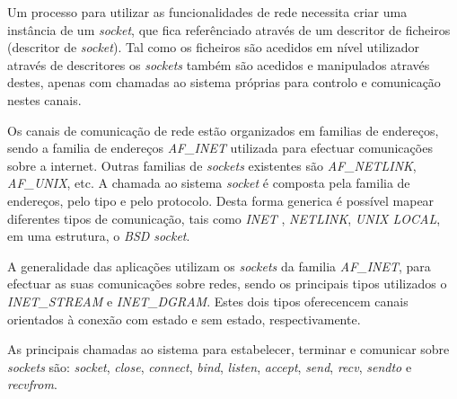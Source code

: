  Um processo para utilizar as funcionalidades de rede necessita criar uma instância de um \textit{socket}, que fica referênciado através de um descritor de ficheiros (descritor de \textit{socket}).
 Tal como os ficheiros são acedidos em nível utilizador através de descritores os \textit{sockets} também são acedidos e manipulados através destes, apenas com chamadas ao sistema próprias para controlo e comunicação nestes canais.



 Os canais de comunicação de rede estão organizados em familias de endereços, sendo a familia de endereços \textit{AF\_INET} utilizada para efectuar comunicações sobre a internet.
Outras familias de \textit{sockets} existentes são \textit{AF\_NETLINK}, \textit{AF\_UNIX}, etc.
A chamada ao sistema \textit{socket} é composta pela familia de endereços, pelo tipo e pelo protocolo.
Desta forma generica é possível mapear diferentes tipos de comunicação, tais como \textit{INET} , \textit{NETLINK}, \textit{UNIX LOCAL}, em uma estrutura, o \textit{BSD socket}.

 A generalidade das aplicações utilizam os \textit{sockets} da familia \textit{AF\_INET}, para efectuar as suas comunicações sobre redes, sendo os principais tipos utilizados o \textit{INET\_STREAM} e \textit{INET\_DGRAM}.
 Estes dois tipos oferecencem canais orientados à conexão com estado e sem estado, respectivamente.



As principais chamadas ao sistema para estabelecer, terminar e comunicar sobre \textit{sockets} são: \textit{socket}, \textit{close}, \textit{connect}, \textit{bind}, \textit{listen}, \textit{accept}, \textit{send}, \textit{recv}, \textit{sendto} e \textit{recvfrom}. 


